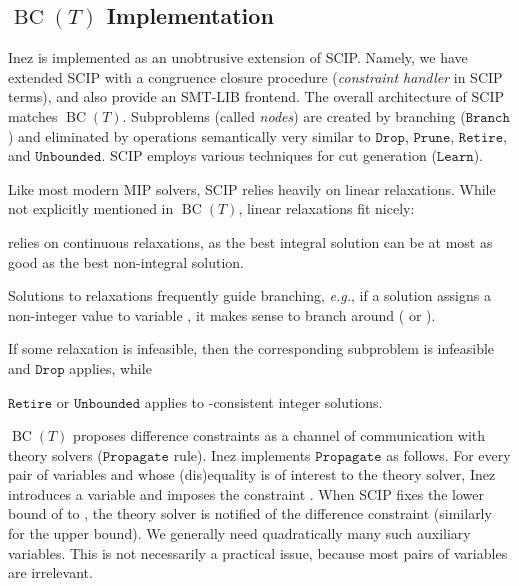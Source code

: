 \documentclass{llncs}
\newcommand{\inez}[0]{\textsf{Inez}}
\newcommand{\comment}[1]{}
\newcommand{\eg}[0]{\emph{e.g.}, }
\newcommand{\tr}[1]{\ensuremath{\mathtt{#1}}}
\newcommand{\bct}[0]{\ensuremath{\operatorname{BC}(T)}}
\begin{document}
\comment{Recall that with the direct encoding of the ILP problems, Z3
  failed to solve any of the instances above. It was only after we
  experimented with several encodings that we found an encoding that
  allowed Z3 to solve some of the problems. The ILP solvers did not
  require special encodings.}

\subsection{\bct{} Implementation}
\label{ssec:implementation}

\inez{} is implemented as an unobtrusive extension of SCIP.  Namely,
we have extended SCIP with a congruence closure procedure
(\emph{constraint handler} in SCIP terms), and also provide an SMT-LIB
frontend. The overall architecture of SCIP matches \bct{}. Subproblems
(called \emph{nodes}) are created by branching (\tr{Branch}) and
eliminated by operations semantically very similar to \tr{Drop},
\tr{Prune}, \tr{Retire}, and \tr{Unbounded}. SCIP employs various
techniques for cut generation (\tr{Learn}).

Like most modern MIP solvers, SCIP relies heavily on linear
relaxations. While not explicitly mentioned in \bct{}, linear
relaxations fit nicely:
\begin{inparaenum}[(a)]
\item  relies on continuous relaxations,
  as the best integral solution can be at most as good as the best
  non-integral solution.
\item Solutions to relaxations frequently guide branching, \eg if a
  solution assigns a non-integer value  to variable , it makes
  sense to branch around  ( or ).
\item If some relaxation is infeasible, then the corresponding
  subproblem is infeasible and \tr{Drop} applies, while
\item \tr{Retire} or \tr{Unbounded} applies to -consistent integer
  solutions.
\end{inparaenum}

\bct{} proposes difference constraints as a channel of communication
with theory solvers (\tr{Propagate} rule). \inez{} implements
\tr{Propagate} as follows. For every pair of variables  and 
whose (dis)equality is of interest to the theory solver, \inez{}
introduces a variable  and imposes the constraint . When SCIP fixes the lower bound of  to , the
theory solver is notified of the difference constraint 
(similarly for the upper bound). We generally need quadratically many
such auxiliary variables. This is not necessarily a practical issue,
because most pairs of variables are irrelevant.
\end{document}
